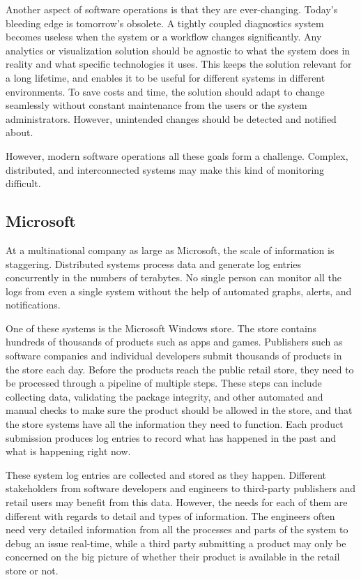 Another aspect of software operations is that they are ever-changing. 
Today's bleeding edge is tomorrow's obsolete. A tightly coupled diagnostics system
becomes useless when the system or a workflow changes significantly. Any analytics or visualization solution should
be agnostic to what the system does in reality and what specific technologies it uses. 
This keeps the solution relevant for a long lifetime, 
and enables it to be useful for different systems in different environments. 
To save costs and time, the solution should adapt to change seamlessly without constant maintenance from the users or the system administrators. However, unintended changes should be detected and notified about.

However, modern software operations all these goals form a challenge.
Complex, distributed, and interconnected systems may make this kind of monitoring difficult.

\subsection{Microsoft}
At a multinational company as large as Microsoft, the scale of information is staggering.
Distributed systems process data and generate log entries concurrently in the numbers of terabytes.
No single person can monitor all the logs from even a single system without the help of automated
graphs, alerts, and notifications.  

One of these systems is the Microsoft Windows store. The store contains hundreds of thousands of products
such as apps and games. Publishers such as software companies and individual developers submit thousands of 
products in the store each day. Before the products reach the public retail store, they need to be processed
through a pipeline of multiple steps. These steps can include collecting data, validating the package integrity, and
other automated and manual checks to make sure the product should be allowed in the store, 
and that the store systems have all the information they need to function.
Each product submission produces log entries to record what has happened in the past and what is happening right now.

These system log entries are collected and stored as they happen. 
Different stakeholders from software developers and engineers to third-party publishers and retail users 
may benefit from this data. However, the needs for each of them are
different with regards to detail and types of information.
The engineers often need very detailed information from all the processes and parts of the system to debug an issue real-time,
while a third party submitting a product may only be concerned on the big picture of whether their 
product is available in the retail store or not.

